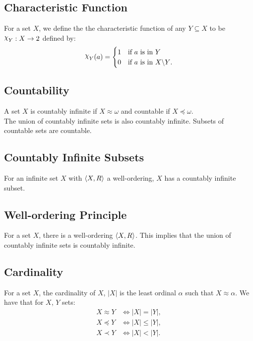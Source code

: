 \subsection{Characteristic Function}

For a set $X$, we define the the characteristic function of any $Y \subseteq X$
to be $\varchi_Y : X \to 2$ defined by: \begin{align*}
    \varchi_Y(a) = \begin{cases}
        1 & \text{if $a$ is in $Y$} \\
        0 & \text{if $a$ is in $X \backslash Y$}.
    \end{cases}
\end{align*}

\subsection{Countability}

A set $X$ is countably infinite if $X \approx \omega$ and countable if
$X \preceq \omega$. 
\\[\baselineskip]
The union of countably infinite sets is also countably infinite.
Subsets of countable sets are countable.

\subsection{Countably Infinite Subsets}

For an infinite set $X$ with $\langle X, R \rangle$ a well-ordering, $X$ has a
countably infinite subset.

\subsection{Well-ordering Principle}

For a set $X$, there is a well-ordering $\langle X, R \rangle$.
This implies that the union of countably infinite sets
is countably infinite.

\subsection{Cardinality}

For a set $X$, the cardinality of $X$, $|X|$ is the
least ordinal $\alpha$ such that $X \approx \alpha$.
We have that for $X$, $Y$ sets: \begin{align*}
    X \approx Y &\Longleftrightarrow |X| = |Y|, \\
    X \preceq Y &\Longleftrightarrow |X| \leq |Y|, \\
    X \prec Y &\Longleftrightarrow |X| < |Y|.
\end{align*}

